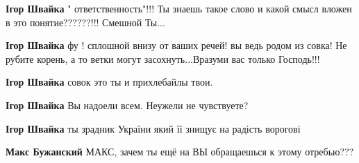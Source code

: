 \begin{itemize}
\begin{itemize}
\textbf{Ігор Швайка} " ответственность"!!! Ты знаешь такое слово и какой смысл вложен в это понятие??????!!! Смешной Ты...🤣🤣🤣

 
\textbf{Ігор Швайка} фу ! сплошной внизу от ваших речей! вы ведь родом из совка! Не рубите корень, а то ветки могут засохнуть...Вразуми вас только Господь!!!

 
\textbf{Ігор Швайка} совок это ты и прихлебайлы твои.

 
\textbf{Ігор Швайка} Вы надоели всем. Неужели не чувствуете?

 
\textbf{Ігор Швайка} ты зрадник України який її знищує на радість ворогові

 
\textbf{Макс Бужанский} МАКС, зачем ты ещё на ВЫ обращаешься к этому отребью???

 

\end{itemize}
\end{itemize}
